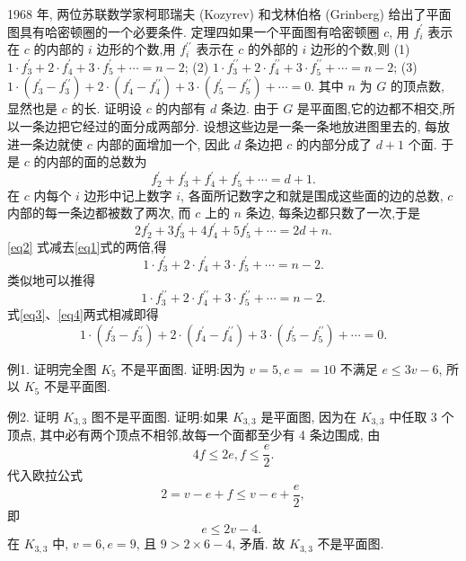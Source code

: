 1968 年, 两位苏联数学家柯耶瑞夫 (Kozyrev) 和戈林伯格 (Grinberg) 给出了平面图具有哈密顿圈的一个必要条件.
定理四如果一个平面图有哈密顿圈 $c$, 用 $f_i^{\prime}$ 表示在 $c$ 的内部的 $i$ 边形的个数,用 $f_i^{\prime \prime}$ 表示在 $c$ 的外部的 $i$ 边形的个数,则
(1) $1 \cdot f_3^{\prime}+2 \cdot f_4^{\prime}+3 \cdot f_5^{\prime}+\cdots=n-2$;
(2) $1 \cdot f_3^{\prime \prime}+2 \cdot f_4^{\prime \prime}+3 \cdot f_5^{\prime \prime}+\cdots=n-2$;
(3) $1 \cdot\left(f_3^{\prime}-f_3^{\prime \prime}\right)+2 \cdot\left(f_4^{\prime}-f_4^{\prime \prime}\right)+3 \cdot\left(f_5^{\prime}-f_5^{\prime \prime}\right)+\cdots=0$.
其中 $n$ 为 $G$ 的顶点数, 显然也是 $c$ 的长.
证明设 $c$ 的内部有 $d$ 条边.
由于 $G$ 是平面图,它的边都不相交,所以一条边把它经过的面分成两部分.
设想这些边是一条一条地放进图里去的, 每放进一条边就使 $c$ 内部的面增加一个, 因此 $d$ 条边把 $c$ 的内部分成了 $d+1$ 个面.
于是 $c$ 的内部的面的总数为
$$
f_2^{\prime}+f_3^{\prime}+f_4^{\prime}+f_5^{\prime}+\cdots=d+1 . \label{eq1}
$$
在 $c$ 内每个 $i$ 边形中记上数字 $i$, 各面所记数字之和就是围成这些面的边的总数, $c$ 内部的每一条边都被数了两次, 而 $c$ 上的 $n$ 条边, 每条边都只数了一次,于是
$$
2 f_2^{\prime}+3 f_3^{\prime}+4 f_4^{\prime}+5 f_5^{\prime}+\cdots=2 d+n . \label{eq2}
$$
\ref{eq2} 式减去\ref{eq1}式的两倍,得
$$
1 \cdot f_3^{\prime}+2 \cdot f_4^{\prime}+3 \cdot f_5^{\prime}+\cdots=n-2 . \label{eq3}
$$
类似地可以推得
$$
1 \cdot f_3^{\prime \prime}+2 \cdot f_4^{\prime \prime}+3 \cdot f_5^{\prime \prime}+\cdots=n-2 . \label{eq4}
$$
式\ref{eq3}、\ref{eq4}两式相减即得
$$
1 \cdot\left(f_3^{\prime}-f_3^{\prime \prime}\right)+2 \cdot\left(f_4^{\prime}-f_4^{\prime \prime}\right)+3 \cdot\left(f_5^{\prime}-f_5^{\prime \prime}\right)+\cdots=0 .
$$



例1. 证明完全图 $K_5$ 不是平面图.
证明:因为 $v=5, e==10$ 不满足 $e \leqslant 3 v-6$, 所以 $K_5$ 不是平面图.



例2. 证明 $K_{3,3}$ 图不是平面图.
证明:如果 $K_{3,3}$ 是平面图, 因为在 $K_{3,3}$ 中任取 3 个顶点, 其中必有两个顶点不相邻,故每一个面都至少有 4 条边围成, 由
$$
4 f \leqslant 2 e, f \leqslant \frac{e}{2} .
$$
代入欧拉公式
$$
2=v-e+f \leqslant v-e+\frac{e}{2},
$$
即
$$
e \leqslant 2 v-4 \text {. }
$$
在 $K_{3,3}$ 中, $v=6, e=9$, 且 $9>2 \times 6-4$, 矛盾.
故 $K_{3,3}$ 不是平面图.



